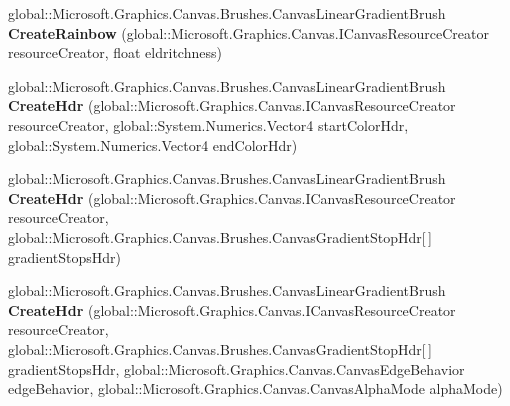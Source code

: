 \begin{DoxyCompactItemize}
global\+::\+Microsoft.\+Graphics.\+Canvas.\+Brushes.\+Canvas\+Linear\+Gradient\+Brush {\bfseries Create\+Rainbow} (global\+::\+Microsoft.\+Graphics.\+Canvas.\+I\+Canvas\+Resource\+Creator resource\+Creator, float eldritchness)
\item 
\mbox{\label{interface_microsoft_1_1_graphics_1_1_canvas_1_1_brushes_1_1_i_canvas_linear_gradient_brush_statics_aa478a0f38fa948c5b103ee834fb17cb9}} 
global\+::\+Microsoft.\+Graphics.\+Canvas.\+Brushes.\+Canvas\+Linear\+Gradient\+Brush {\bfseries Create\+Hdr} (global\+::\+Microsoft.\+Graphics.\+Canvas.\+I\+Canvas\+Resource\+Creator resource\+Creator, global\+::\+System.\+Numerics.\+Vector4 start\+Color\+Hdr, global\+::\+System.\+Numerics.\+Vector4 end\+Color\+Hdr)
\item 
\mbox{\label{interface_microsoft_1_1_graphics_1_1_canvas_1_1_brushes_1_1_i_canvas_linear_gradient_brush_statics_ac231ec716863bab8840f768a97c723a7}} 
global\+::\+Microsoft.\+Graphics.\+Canvas.\+Brushes.\+Canvas\+Linear\+Gradient\+Brush {\bfseries Create\+Hdr} (global\+::\+Microsoft.\+Graphics.\+Canvas.\+I\+Canvas\+Resource\+Creator resource\+Creator, global\+::\+Microsoft.\+Graphics.\+Canvas.\+Brushes.\+Canvas\+Gradient\+Stop\+Hdr\mbox{[}$\,$\mbox{]} gradient\+Stops\+Hdr)
\item 
\mbox{\label{interface_microsoft_1_1_graphics_1_1_canvas_1_1_brushes_1_1_i_canvas_linear_gradient_brush_statics_a9d2b811c75f53b8dd5784da5b0d87a96}} 
global\+::\+Microsoft.\+Graphics.\+Canvas.\+Brushes.\+Canvas\+Linear\+Gradient\+Brush {\bfseries Create\+Hdr} (global\+::\+Microsoft.\+Graphics.\+Canvas.\+I\+Canvas\+Resource\+Creator resource\+Creator, global\+::\+Microsoft.\+Graphics.\+Canvas.\+Brushes.\+Canvas\+Gradient\+Stop\+Hdr\mbox{[}$\,$\mbox{]} gradient\+Stops\+Hdr, global\+::\+Microsoft.\+Graphics.\+Canvas.\+Canvas\+Edge\+Behavior edge\+Behavior, global\+::\+Microsoft.\+Graphics.\+Canvas.\+Canvas\+Alpha\+Mode alpha\+Mode)
\item 
\mbox{\label{interface_microsoft_1_1_graphics_1_1_canvas_1_1_brushes_1_1_i_canvas_linear_gradient_brush_statics_a12d4c23a29a2ebceddbe80b2d3bd32de}} 

\end{DoxyCompactItemize}
